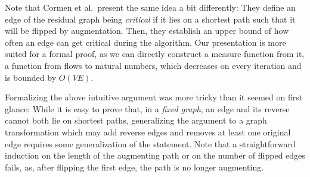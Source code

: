 \documentclass{llncs}
\begin{document}
  Note that Cormen et al.~present the same idea a bit differently: They define an edge of the residual graph being \emph{critical} if it lies on a shortest path such that it will be flipped by augmentation. Then, they establish an upper bound of how often an edge can get critical during the algorithm. Our presentation is more suited for a formal proof, as we can directly construct a measure function from it, \ie a function from flows to natural numbers, which decreases on every iteration and is bounded by $O(VE)$. 
  
  Formalizing the above intuitive argument was more tricky than it seemed on first glance:
  While it is easy to prove that, in a \emph{fixed graph}, an edge and its reverse cannot both lie on shortest paths, generalizing the argument
  to a graph transformation which may add reverse edges and removes at least one original edge requires some generalization of the statement.
  Note that a straightforward induction on the length of the augmenting path or on the number of flipped edges fails, as, after flipping the first 
  edge, the path is no longer augmenting.
  
%   
%   
%   
  
\end{document}
